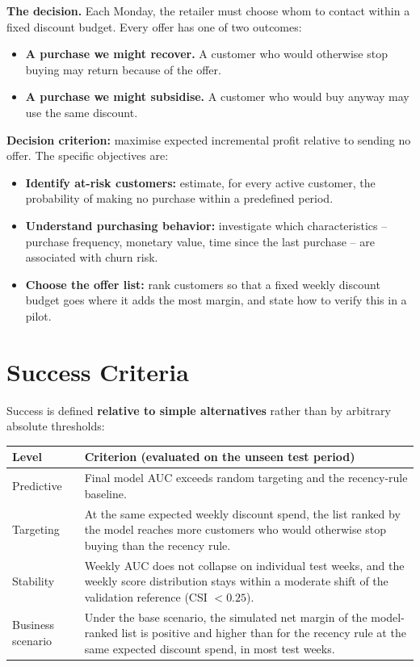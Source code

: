 \textbf{The decision.} Each Monday, the retailer must choose whom to contact within a fixed discount budget. Every offer has one of two outcomes:

\begin{itemize}
    \item \textbf{A purchase we might recover.} A customer who would otherwise stop buying may return because of the offer.
    \item \textbf{A purchase we might subsidise.} A customer who would buy anyway may use the same discount.
\end{itemize}

\textbf{Decision criterion:} maximise expected incremental profit relative to sending no offer. The specific objectives are:

\begin{itemize}
    \item \textbf{Identify at-risk customers:} estimate, for every active customer, the probability of making no purchase within a predefined period.
    \item \textbf{Understand purchasing behavior:} investigate which characteristics -- purchase frequency, monetary value, time since the last purchase -- are associated with churn risk.
    \item \textbf{Choose the offer list:} rank customers so that a fixed weekly discount budget goes where it adds the most margin, and state how to verify this in a pilot.
\end{itemize}

\section{Success Criteria}
\label{sec:2-6}

Success is defined \textbf{relative to simple alternatives} rather than by arbitrary absolute thresholds:

\begin{center}
\begin{tabular}{@{}p{3cm}p{11.5cm}@{}}
    \toprule
    Level & Criterion (evaluated on the unseen test period) \\
    \midrule
    Predictive & Final model AUC exceeds random targeting and the recency-rule baseline. \\
    Targeting & At the same expected weekly discount spend, the list ranked by the model reaches more customers who would otherwise stop buying than the recency rule. \\
    Stability & Weekly AUC does not collapse on individual test weeks, and the weekly score distribution stays within a moderate shift of the validation reference (CSI $< 0.25$). \\
    Business scenario & Under the base scenario, the simulated net margin of the model-ranked list is positive and higher than for the recency rule at the same expected discount spend, in most test weeks. \\
    \bottomrule
\end{tabular}
\end{center}

